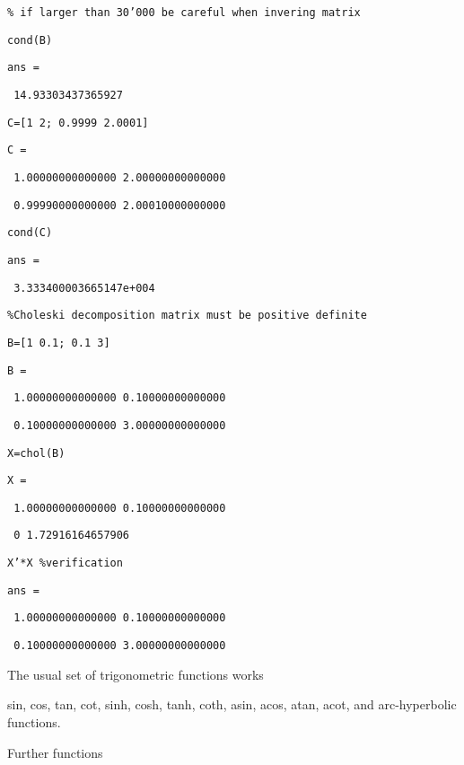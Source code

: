 \documentclass[12pt,a4paper]{article}
\begin{document}
\texttt{\% if larger than 30'000 be careful when invering matrix}

\texttt{cond(B)}

\texttt{ans =}

\texttt{\ 14.93303437365927}

\texttt{C=[1 2; 0.9999 2.0001]}

\texttt{C =}

\texttt{\ 1.00000000000000 2.00000000000000}

\texttt{\ 0.99990000000000 2.00010000000000}

\texttt{cond(C)}

\texttt{ans =}

\texttt{\ 3.333400003665147e+004}

\texttt{\%Choleski decomposition matrix must be positive definite}

\texttt{B=[1 0.1; 0.1 3]}

\texttt{B =}

\texttt{\ 1.00000000000000 0.10000000000000}

\texttt{\ 0.10000000000000 3.00000000000000}

\texttt{X=chol(B)}

\texttt{X =}

\texttt{\ 1.00000000000000 0.10000000000000}

\texttt{\ 0 1.72916164657906}

\texttt{X'*X \%verification}

\texttt{ans =}

\texttt{\ 1.00000000000000 0.10000000000000}

\texttt{\ 0.10000000000000 3.00000000000000}

\bigskip

The usual set of trigonometric functions works

sin, cos, tan, cot, sinh, cosh, tanh, coth, asin, acos, atan, acot, and
arc-hyperbolic functions.

Further functions
\end{document}
